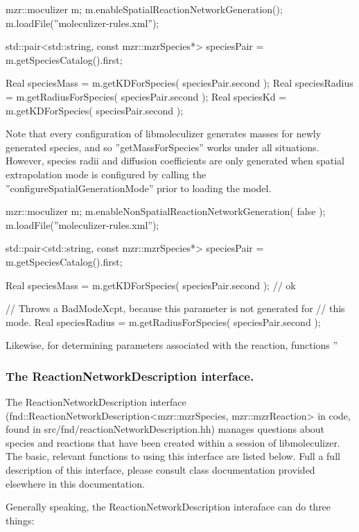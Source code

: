 \begin{1st listing}
\begin{1stlisting}
mzr::moculizer m;
m.enableSpatialReactionNetworkGeneration();
m.loadFile(''moleculizer-rules.xml'');

std::pair<std::string, const mzr::mzrSpecies*> speciesPair =
m.getSpeciesCatalog().first;

Real speciesMass = m.getKDForSpecies( speciesPair.second );
Real speciesRadius = m.getRadiusForSpecies( speciesPair.second );
Real speciesKd = m.getKDForSpecies( speciesPair.second );
\end{1stlisting}

Note that every configuration of libmoleculizer generates masses for
newly generated species, and so ''getMassForSpecies'' works under all
situations.  However, species radii and diffusion coefficients are
only generated when spatial extrapolation mode is configured by
calling the ''configureSpatialGenerationMode'' prior to loading the
model.  

\begin{1stlisting}
mzr::moculizer m;
m.enableNonSpatialReactionNetworkGeneration( false );
m.loadFile(''moleculizer-rules.xml'');

std::pair<std::string, const mzr::mzrSpecies*> speciesPair =
m.getSpeciesCatalog().first;

Real speciesMass = m.getKDForSpecies( speciesPair.second ); // ok

// Throws a BadModeXcpt, because this parameter is not generated for
// this mode.
Real speciesRadius = m.getRadiusForSpecies( speciesPair.second ); 
\end{1stlisting}

Likewise, for determining parameters associated with the reaction,
functions ''



\subsubsection{The ReactionNetworkDescription interface.}
The ReactionNetworkDescription interface
(fnd::ReactionNetworkDescription<mzr::mzrSpecies, mzr::mzrReaction> in
code, found in src/fnd/reactionNetworkDescription.hh) manages questions
about species and reactions that have been created within a session of
libmoleculizer.  The basic, relevant functions to using this interface
are listed below.  Full a full description of this interface, please
consult class documentation provided elsewhere in this documentation.

Generally speaking, the ReactionNetworkDescription interaface can do
three things:


\end{1st listing}
